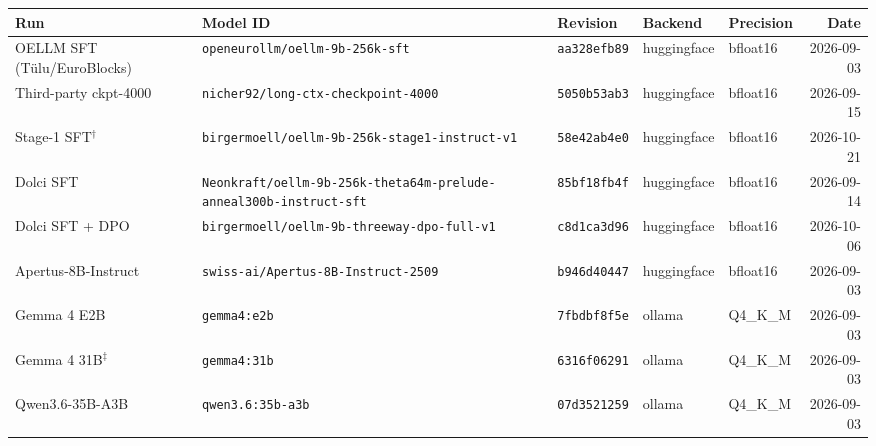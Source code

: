 \begin{tabular}{lllllr}
\toprule
Run & Model ID & Revision & Backend & Precision & Date \\
\midrule
OELLM SFT (T\"ulu/EuroBlocks) & \texttt{openeurollm/oellm-9b-256k-sft} & \texttt{aa328efb89} & huggingface & bfloat16 & 2026-09-03 \\
Third-party ckpt-4000 & \texttt{nicher92/long-ctx-checkpoint-4000} & \texttt{5050b53ab3} & huggingface & bfloat16 & 2026-09-15 \\
Stage-1 SFT$^\dagger$ & \texttt{birgermoell/oellm-9b-256k-stage1-instruct-v1} & \texttt{58e42ab4e0} & huggingface & bfloat16 & 2026-10-21 \\
Dolci SFT & \texttt{Neonkraft/oellm-9b-256k-theta64m-prelude-anneal300b-instruct-sft} & \texttt{85bf18fb4f} & huggingface & bfloat16 & 2026-09-14 \\
Dolci SFT + DPO & \texttt{birgermoell/oellm-9b-threeway-dpo-full-v1} & \texttt{c8d1ca3d96} & huggingface & bfloat16 & 2026-10-06 \\
Apertus-8B-Instruct & \texttt{swiss-ai/Apertus-8B-Instruct-2509} & \texttt{b946d40447} & huggingface & bfloat16 & 2026-09-03 \\
Gemma 4 E2B & \texttt{gemma4:e2b} & \texttt{7fbdbf8f5e} & ollama & Q4\_K\_M & 2026-09-03 \\
Gemma 4 31B$^\ddagger$ & \texttt{gemma4:31b} & \texttt{6316f06291} & ollama & Q4\_K\_M & 2026-09-03 \\
Qwen3.6-35B-A3B & \texttt{qwen3.6:35b-a3b} & \texttt{07d3521259} & ollama & Q4\_K\_M & 2026-09-03 \\
\bottomrule
\end{tabular}
